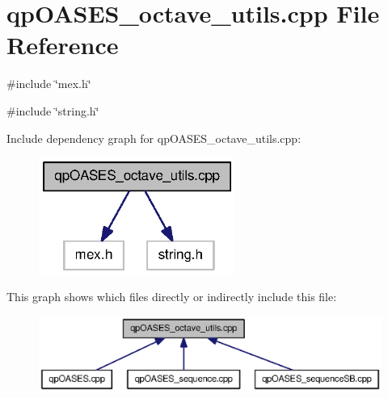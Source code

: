 \section{qpOASES\_\-octave\_\-utils.cpp File Reference}
\label{qpOASES__octave__utils_8cpp}
{\ttfamily \#include \char`\"{}mex.h\char`\"{}}\par
{\ttfamily \#include \char`\"{}string.h\char`\"{}}\par
Include dependency graph for qpOASES\_\-octave\_\-utils.cpp:
\nopagebreak
\begin{figure}[H]
\begin{center}
\leavevmode
\includegraphics[width=182pt]{qpOASES__octave__utils_8cpp__incl}
\end{center}
\end{figure}
This graph shows which files directly or indirectly include this file:
\nopagebreak
\begin{figure}[H]
\begin{center}
\leavevmode
\includegraphics[width=400pt]{qpOASES__octave__utils_8cpp__dep__incl}
\end{center}
\end{figure}
